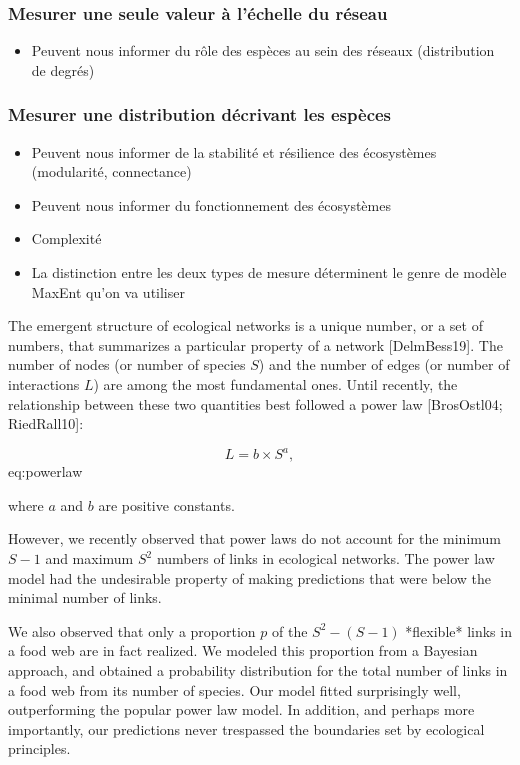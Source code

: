 \subsubsection{Mesurer une seule valeur à l'échelle du réseau} 

\begin{itemize}
    \item Peuvent nous informer du rôle des espèces au sein des réseaux (distribution de degrés)
\end{itemize}

\subsubsection{Mesurer une distribution décrivant les espèces} 

\begin{itemize}
    \item Peuvent nous informer de la stabilité et résilience des écosystèmes (modularité, connectance)
    \item Peuvent nous informer du fonctionnement des écosystèmes 
    \item Complexité 
    \item La distinction entre les deux types de mesure déterminent le genre de modèle MaxEnt qu'on va utiliser
\end{itemize}

The emergent structure of ecological networks is a unique number, or a set of
numbers, that summarizes a particular property of a network [DelmBess19]. The
number of nodes (or number of species $S$) and the number of edges (or number of
interactions $L$) are among the most fundamental ones. Until recently, the
relationship between these two quantities best followed a power law
[BrosOstl04; RiedRall10]:

$$ L = b \times S^a, $$ {eq:powerlaw}

where $a$ and $b$ are positive constants.

However, we recently observed that power laws do not account for the minimum
$S-1$ and maximum $S^2$ numbers of links in ecological networks. The power law model had the undesirable property of
making predictions that were below the minimal number of links.

We also observed that only a proportion $p$ of the $S^2 - (S-1)$ *flexible*
links in a food web are in fact realized. We modeled this proportion from a
Bayesian approach, and obtained a probability distribution for the total number
of links in a food web from its number of species. Our model fitted surprisingly
well, outperforming the popular power law model. In addition, and perhaps more
importantly, our predictions never trespassed the boundaries set by ecological
principles.

